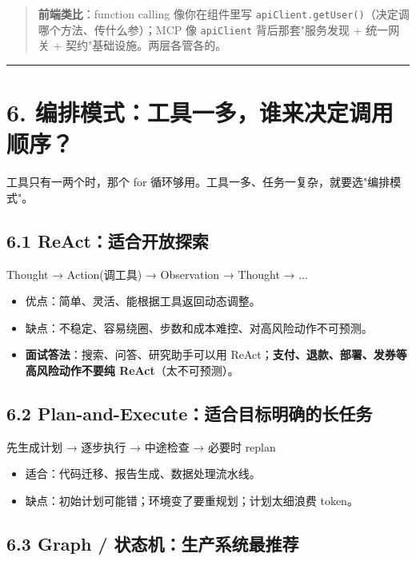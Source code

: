 \begin{quote}
 \textbf{前端类比}：function calling 像你在组件里写 \texttt{apiClient.getUser()}（决定调哪个方法、传什么参）；MCP 像 \texttt{apiClient} 背后那套"服务发现 + 统一网关 + 契约"基础设施。两层各管各的。
\end{quote}

\bigskip\hrule\bigskip

\section{6. 编排模式：工具一多，谁来决定调用顺序？}

工具只有一两个时，那个 for 循环够用。工具一多、任务一复杂，就要选"编排模式"。

\subsection{6.1 ReAct：适合开放探索}

\begin{codeblock}
Thought → Action(调工具) → Observation → Thought → ...
\end{codeblock}

\begin{itemize}[leftmargin=2em]
\item 优点：简单、灵活、能根据工具返回动态调整。
\item 缺点：不稳定、容易绕圈、步数和成本难控、对高风险动作不可预测。
\item \textbf{面试答法}：搜索、问答、研究助手可以用 ReAct；\textbf{支付、退款、部署、发券等高风险动作不要纯 ReAct}（太不可预测）。
\end{itemize}

\subsection{6.2 Plan-and-Execute：适合目标明确的长任务}

\begin{codeblock}
先生成计划 → 逐步执行 → 中途检查 → 必要时 replan
\end{codeblock}

\begin{itemize}[leftmargin=2em]
\item 适合：代码迁移、报告生成、数据处理流水线。
\item 缺点：初始计划可能错；环境变了要重规划；计划太细浪费 token。
\end{itemize}

\subsection{6.3 Graph / 状态机：生产系统最推荐}

